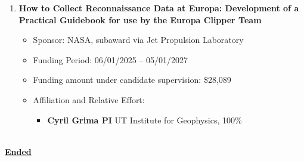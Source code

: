 \begin{enumerate}[leftmargin=2.5em, labelsep=1.5em, label=UR\arabic*]
    \item
        \textbf{How to Collect Reconnaissance Data at Europa: Development of a Practical Guidebook for use by the Europa Clipper Team}
        \begin{itemize}[leftmargin=0em, labelsep=1em, topsep=-.5em, itemsep=-.2em]
            \item Sponsor: NASA, subaward via Jet Propulsion Laboratory
            \item Funding Period: 06/01/2025 – 05/01/2027
            \item Funding amount under candidate supervision: \$28,089
            \item Affiliation and Relative Effort:
            \TabPositions{4cm, 5.5cm}
            \begin{itemize}[leftmargin=2em, labelsep=1em, topsep=-.5em, itemsep=-.2em]
                \item \textbf{Cyril Grima \tab PI} \tab  UT Institute for Geophysics, 100\%
            \end{itemize}
        \end{itemize}
\end{enumerate}




\textbf{\ul{\\ Ended}}

